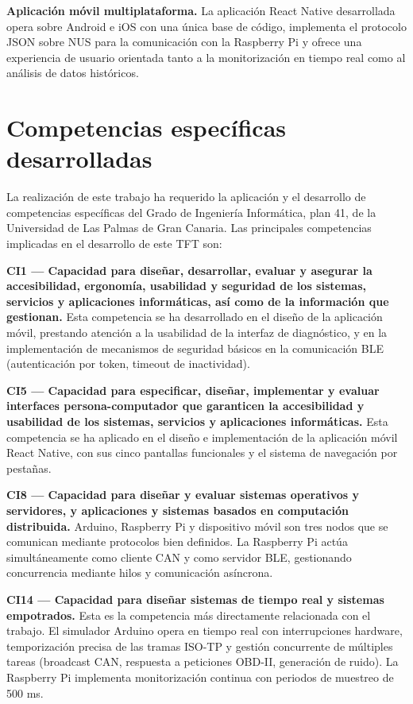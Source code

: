 \textbf{Aplicación móvil multiplataforma.} La aplicación React Native desarrollada opera sobre Android e iOS con una única base de código, implementa el protocolo JSON sobre NUS para la comunicación con la Raspberry Pi y ofrece una experiencia de usuario orientada tanto a la monitorización en tiempo real como al análisis de datos históricos.

\section{Competencias específicas desarrolladas}

La realización de este trabajo ha requerido la aplicación y el desarrollo de competencias específicas del Grado de Ingeniería Informática, plan 41, de la Universidad de Las Palmas de Gran Canaria. Las principales competencias implicadas en el desarrollo de este TFT son:

\textbf{CI1 — Capacidad para diseñar, desarrollar, evaluar y asegurar la accesibilidad, ergonomía, usabilidad y seguridad de los sistemas, servicios y aplicaciones informáticas, así como de la información que gestionan.} Esta competencia se ha desarrollado en el diseño de la aplicación móvil, prestando atención a la usabilidad de la interfaz de diagnóstico, y en la implementación de mecanismos de seguridad básicos en la comunicación BLE (autenticación por token, timeout de inactividad).

\textbf{CI5 — Capacidad para especificar, diseñar, implementar y evaluar interfaces persona-computador que garanticen la accesibilidad y usabilidad de los sistemas, servicios y aplicaciones informáticas.} Esta competencia se ha aplicado en el diseño e implementación de la aplicación móvil React Native, con sus cinco pantallas funcionales y el sistema de navegación por pestañas.

\textbf{CI8 — Capacidad para diseñar y evaluar sistemas operativos y servidores, y aplicaciones y sistemas basados en computación distribuida.} Arduino, Raspberry Pi y dispositivo móvil son tres nodos que se comunican mediante protocolos bien definidos. La Raspberry Pi actúa simultáneamente como cliente CAN y como servidor BLE, gestionando concurrencia mediante hilos y comunicación asíncrona.

\textbf{CI14 — Capacidad para diseñar sistemas de tiempo real y sistemas empotrados.} Esta es la competencia más directamente relacionada con el trabajo. El simulador Arduino opera en tiempo real con interrupciones hardware, temporización precisa de las tramas ISO-TP y gestión concurrente de múltiples tareas (broadcast CAN, respuesta a peticiones OBD-II, generación de ruido). La Raspberry Pi implementa monitorización continua con periodos de muestreo de 500 ms.

